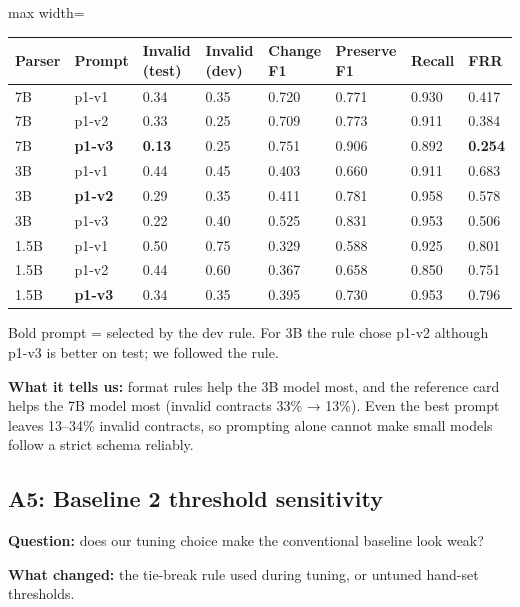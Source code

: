 \documentclass[11pt]{article}
\begin{document}
\begin{table}[!tp]
\centering\scriptsize\setlength{\tabcolsep}{3pt}\renewcommand{\arraystretch}{1.1}
\begin{adjustbox}{max width=\textwidth}\begin{tabular}{llllllll}
\toprule
\textbf{Parser} & \textbf{Prompt} & \textbf{Invalid (test)} & \textbf{Invalid (dev)} & \textbf{Change F1} & \textbf{Preserve F1} & \textbf{Recall} & \textbf{FRR} \\
\midrule
7B & p1-v1 & 0.34 & 0.35 & 0.720 & 0.771 & 0.930 & 0.417 \\
7B & p1-v2 & 0.33 & 0.25 & 0.709 & 0.773 & 0.911 & 0.384 \\
7B & \textbf{p1-v3} & \textbf{0.13} & 0.25 & 0.751 & 0.906 & 0.892 & \textbf{0.254} \\
3B & p1-v1 & 0.44 & 0.45 & 0.403 & 0.660 & 0.911 & 0.683 \\
3B & \textbf{p1-v2} & 0.29 & 0.35 & 0.411 & 0.781 & 0.958 & 0.578 \\
3B & p1-v3 & 0.22 & 0.40 & 0.525 & 0.831 & 0.953 & 0.506 \\
1.5B & p1-v1 & 0.50 & 0.75 & 0.329 & 0.588 & 0.925 & 0.801 \\
1.5B & p1-v2 & 0.44 & 0.60 & 0.367 & 0.658 & 0.850 & 0.751 \\
1.5B & \textbf{p1-v3} & 0.34 & 0.35 & 0.395 & 0.730 & 0.953 & 0.796 \\
\bottomrule
\end{tabular}\end{adjustbox}
\end{table}

Bold prompt = selected by the dev rule. For 3B the rule chose p1-v2
although p1-v3 is better on test; we followed the rule.

\textbf{What it tells us:} format rules help the 3B model most, and the
reference card helps the 7B model most (invalid contracts 33\% → 13\%).
Even the best prompt leaves 13--34\% invalid contracts, so prompting
alone cannot make small models follow a strict schema reliably.

\subsection{A5: Baseline 2 threshold sensitivity}

\textbf{Question:} does our tuning choice make the conventional baseline
look weak?

\textbf{What changed:} the tie-break rule used during tuning, or untuned
hand-set thresholds.
\end{document}
